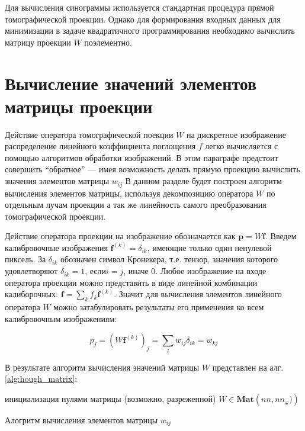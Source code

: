 Для вычисления синограммы используется стандартная процедура прямой томографической проекции.
Однако для формирования входных данных для минимизации в задаче квадратичного программирования необходимо вычислить матрицу проекции $W$ поэлементно.

\section{Вычисление значений элементов матрицы проекции}

Действие оператора томографической поекции $W$ на дискретное изображение распределение линейного коэффициента поглощения $f$ легко вычисляется с помощью алгоритмов обработки изображений.
В этом параграфе  предстоит совершить ``обратное'' --- имея возможность делать прямую проекцию вычислить значения элементов матрицы $w_{ij}$
В данном разделе будет построен алгоритм вычисления элементов матрицы, используя декомпозицию оператора $W$ по отдельным лучам проекции а так же линейность самого преобразования томографической проекции.

Действие оператора проекции на изображение обозначается как $\mathbf{p} = W\mathbf{f}$.
Введем калибровочные изображения $\mathbf{f}^{(k)} = \delta_{ik}$, имеющие только один ненулевой пиксель.
За $\delta_{ik}$ обозначен символ Кронекера, т.е. тензор, значения которого удовлетворяют $\delta_{ik} = 1 \text{, если} i = j \text{, иначе } 0$.
Любое изображение на входе оператора проекции можно представить в виде линейной комбинации калиборочных: $\mathbf{f} = \sum_k f_k \mathbf{f}^{(k)}$.
Значит для вычисления элементов линейного оператора $W$ можно затабулировать результаты его применения ко всем калибровочным изображениям:

\begin{equation}
  \label{eq:w_on_calib_img}
  p_j = \left(W \mathbf{f}^{(k)} \right)_j = \sum_i w_{ij} \delta_{ik} = w_{kj}
\end{equation}

В результате алгоритм вычисления значений матрицы $W$ представлен на алг. \ref{alg:hough_matrix}:

\begin{algorithm}[H]
 инициализация нулями матрицы (возможно, разреженной) $W \in \textbf{Mat}\left(nn, nn_\varphi)\right)$\;
 \caption{Алогритм вычисления элементов матрицы $w_{ij}$}
 \label{alg:hough_matrix}
\end{algorithm}

